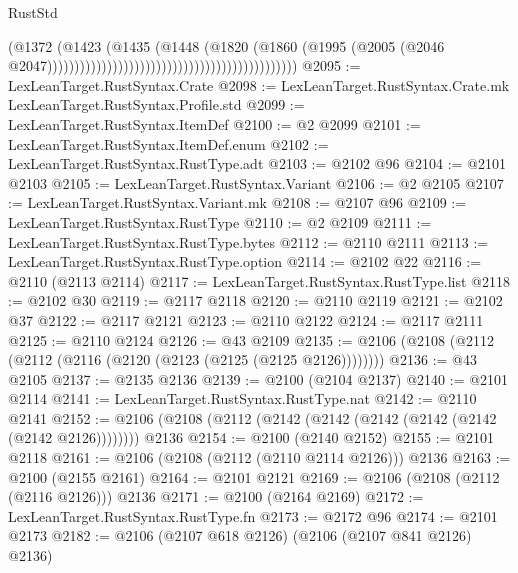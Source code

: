 \begin{lexlean}{RustStd}
\begin{coremodule}
                                                                              (@1372
                                                                                (@1423
                                                                                  (@1435
                                                                                    (@1448
                                                                                      (@1820
                                                                                        (@1860
                                                                                          (@1995
                                                                                            (@2005
                                                                                              (@2046
                                                                                                @2047))))))))))))))))))))))))))))))))))))))))))))))
@2095 := LexLeanTarget.RustSyntax.Crate
@2098 := LexLeanTarget.RustSyntax.Crate.mk LexLeanTarget.RustSyntax.Profile.std
@2099 := LexLeanTarget.RustSyntax.ItemDef
@2100 := @2 @2099
@2101 := LexLeanTarget.RustSyntax.ItemDef.enum
@2102 := LexLeanTarget.RustSyntax.RustType.adt
@2103 := @2102 @96
@2104 := @2101 @2103
@2105 := LexLeanTarget.RustSyntax.Variant
@2106 := @2 @2105
@2107 := LexLeanTarget.RustSyntax.Variant.mk
@2108 := @2107 @96
@2109 := LexLeanTarget.RustSyntax.RustType
@2110 := @2 @2109
@2111 := LexLeanTarget.RustSyntax.RustType.bytes
@2112 := @2110 @2111
@2113 := LexLeanTarget.RustSyntax.RustType.option
@2114 := @2102 @22
@2116 := @2110 (@2113 @2114)
@2117 := LexLeanTarget.RustSyntax.RustType.list
@2118 := @2102 @30
@2119 := @2117 @2118
@2120 := @2110 @2119
@2121 := @2102 @37
@2122 := @2117 @2121
@2123 := @2110 @2122
@2124 := @2117 @2111
@2125 := @2110 @2124
@2126 := @43 @2109
@2135 := @2106 (@2108 (@2112 (@2112 (@2116 (@2120 (@2123 (@2125 (@2125 @2126))))))))
@2136 := @43 @2105
@2137 := @2135 @2136
@2139 := @2100 (@2104 @2137)
@2140 := @2101 @2114
@2141 := LexLeanTarget.RustSyntax.RustType.nat
@2142 := @2110 @2141
@2152 := @2106 (@2108 (@2112 (@2142 (@2142 (@2142 (@2142 (@2142 (@2142 @2126)))))))) @2136
@2154 := @2100 (@2140 @2152)
@2155 := @2101 @2118
@2161 := @2106 (@2108 (@2112 (@2110 @2114 @2126))) @2136
@2163 := @2100 (@2155 @2161)
@2164 := @2101 @2121
@2169 := @2106 (@2108 (@2112 (@2116 @2126))) @2136
@2171 := @2100 (@2164 @2169)
@2172 := LexLeanTarget.RustSyntax.RustType.fn
@2173 := @2172 @96
@2174 := @2101 @2173
@2182 := @2106 (@2107 @618 @2126) (@2106 (@2107 @841 @2126) @2136)

\end{coremodule}
\end{lexlean}

